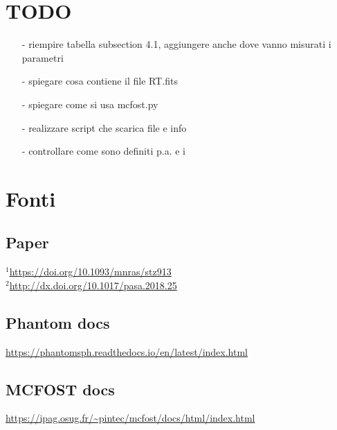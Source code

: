 \documentclass[DIN, pagenumber=false, fontsize=11pt, parskip=half]{scrartcl}
\begin{document}
\section{TODO}
\begin{enumerate}
 \item[-] riempire tabella subsection 4.1, aggiungere anche dove vanno misurati i parametri
 \item[-] spiegare cosa contiene il file RT.fits
 \item[-] spiegare come si usa mcfost.py
 \item[-] realizzare script che scarica file e info
 \item[-] controllare come sono definiti p.a. e i
\end{enumerate}


\section{Fonti}

\subsection{Paper}
\label{source}
 $^1$\url{https://doi.org/10.1093/mnras/stz913} \\
 $^2$\url{http://dx.doi.org/10.1017/pasa.2018.25}
\subsection{Phantom docs}
\url{https://phantomsph.readthedocs.io/en/latest/index.html}

\subsection{MCFOST docs}
\url{https://ipag.osug.fr/~pintec/mcfost/docs/html/index.html}
\end{document}
